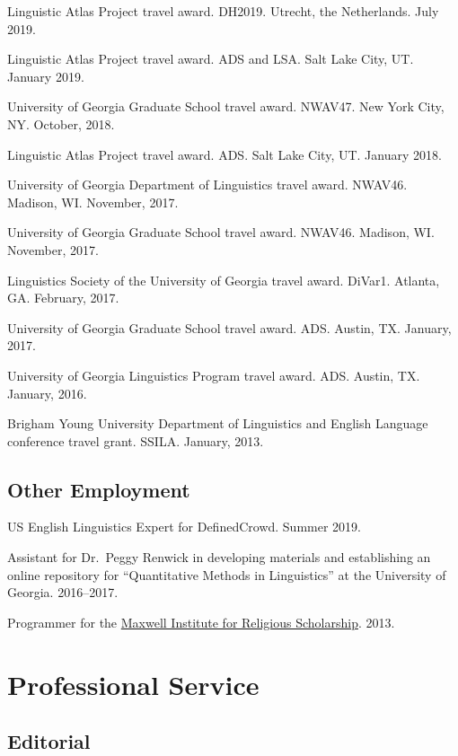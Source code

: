 \documentclass[
]{article}
\begin{document}
Linguistic Atlas Project travel award. DH2019. Utrecht, the Netherlands.
July 2019.

Linguistic Atlas Project travel award. ADS and LSA. Salt Lake City, UT.
January 2019.

University of Georgia Graduate School travel award. NWAV47. New York
City, NY. October, 2018.

Linguistic Atlas Project travel award. ADS. Salt Lake City, UT. January
2018.

University of Georgia Department of Linguistics travel award. NWAV46.
Madison, WI. November, 2017.

University of Georgia Graduate School travel award. NWAV46. Madison, WI.
November, 2017.

Linguistics Society of the University of Georgia travel award. DiVar1.
Atlanta, GA. February, 2017.

University of Georgia Graduate School travel award. ADS. Austin, TX.
January, 2017.

University of Georgia Linguistics Program travel award. ADS. Austin, TX.
January, 2016.

Brigham Young University Department of Linguistics and English Language
conference travel grant. SSILA. January, 2013.

\hypertarget{other-employment}{%
\subsection{Other Employment}\label{other-employment}}

US English Linguistics Expert for DefinedCrowd. Summer 2019.

Assistant for Dr.~Peggy Renwick in developing materials and establishing
an online repository for ``Quantitative Methods in Linguistics'' at the
University of Georgia. 2016--2017.

Programmer for the \href{http://mi.byu.edu}{Maxwell Institute for
Religious Scholarship}. 2013.

\hypertarget{professional-service}{%
\section{Professional Service}\label{professional-service}}

\hypertarget{editorial}{%
\subsection{Editorial}\label{editorial}}
\end{document}
